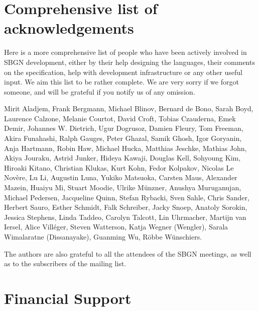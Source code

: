 \section{Comprehensive list of acknowledgements}

Here is a more comprehensive list of people who have been actively involved in SBGN development, either by their help designing the languages, their comments on the specification, help with development infrastructure or any other useful input.  We aim this list to be rather complete. We are very sorry if we forgot someone, and will be grateful if you notify us of any omission.

Mirit Aladjem, Frank Bergmann, Michael Blinov, Bernard de Bono, Sarah Boyd, Laurence Calzone, Melanie Courtot, David Croft, Tobias Czauderna, Emek Demir, Johannes W. Dietrich, Ugur Dogrusoz, Damien Fleury, Tom Freeman, Akira Funahashi, Ralph Gauges, Peter Ghazal, Samik Ghosh, Igor Goryanin, Anja Hartmann, Robin Haw, Michael Hucka, Matthias Jeschke, Mathias John, Akiya Jouraku, Astrid Junker, Hideya Kawaji, Douglas Kell, Sohyoung Kim, Hiroaki Kitano, Christian Klukas, Kurt Kohn, Fedor Kolpakov, Nicolas Le Nov\`{e}re, Lu Li, Augustin Luna, Yukiko Matsuoka, Carsten Maus, Alexander Mazein, Huaiyu Mi, Stuart Moodie, Ulrike M\"unzner, Anushya Muruganujan, Michael Pedersen, Jacqueline Quinn, Stefan Rybacki, Sven Sahle, Chris Sander, Herbert Sauro, Esther Schmidt, Falk Schreiber, Jacky Snoep, Anatoly Sorokin, Jessica Stephens, Linda Taddeo, Carolyn Talcott, Lin Uhrmacher, Martijn van Iersel, Alice Vill\'{e}ger, Steven Watterson, Katja Wegner (Wengler), Sarala Wimalaratne (Dissanayake), Guanming Wu, R\"obbe W\"unschiers.

The authors are also grateful to all the attendees of the SBGN meetings, as well as to the subscribers of the  mailing list.

\section{Financial Support}

